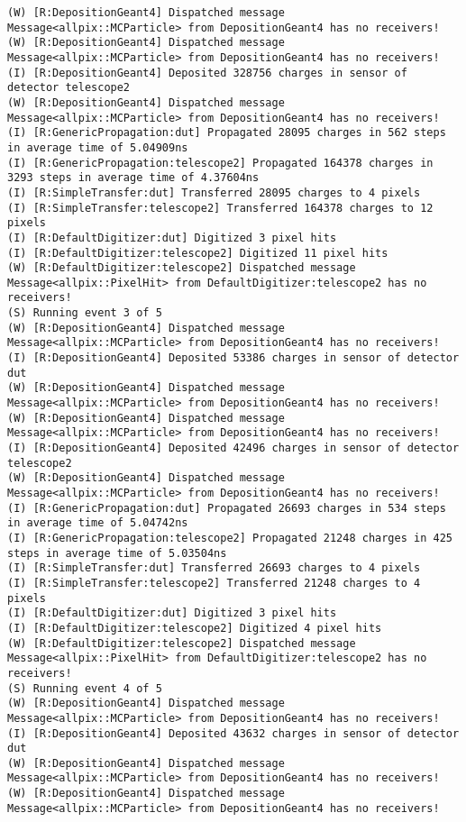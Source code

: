 \begin{lstlisting}[breaklines]
(W) [R:DepositionGeant4] Dispatched message Message<allpix::MCParticle> from DepositionGeant4 has no receivers!
(W) [R:DepositionGeant4] Dispatched message Message<allpix::MCParticle> from DepositionGeant4 has no receivers!
(I) [R:DepositionGeant4] Deposited 328756 charges in sensor of detector telescope2
(W) [R:DepositionGeant4] Dispatched message Message<allpix::MCParticle> from DepositionGeant4 has no receivers!
(I) [R:GenericPropagation:dut] Propagated 28095 charges in 562 steps in average time of 5.04909ns
(I) [R:GenericPropagation:telescope2] Propagated 164378 charges in 3293 steps in average time of 4.37604ns
(I) [R:SimpleTransfer:dut] Transferred 28095 charges to 4 pixels
(I) [R:SimpleTransfer:telescope2] Transferred 164378 charges to 12 pixels
(I) [R:DefaultDigitizer:dut] Digitized 3 pixel hits
(I) [R:DefaultDigitizer:telescope2] Digitized 11 pixel hits
(W) [R:DefaultDigitizer:telescope2] Dispatched message Message<allpix::PixelHit> from DefaultDigitizer:telescope2 has no receivers!
(S) Running event 3 of 5
(W) [R:DepositionGeant4] Dispatched message Message<allpix::MCParticle> from DepositionGeant4 has no receivers!
(I) [R:DepositionGeant4] Deposited 53386 charges in sensor of detector dut
(W) [R:DepositionGeant4] Dispatched message Message<allpix::MCParticle> from DepositionGeant4 has no receivers!
(W) [R:DepositionGeant4] Dispatched message Message<allpix::MCParticle> from DepositionGeant4 has no receivers!
(I) [R:DepositionGeant4] Deposited 42496 charges in sensor of detector telescope2
(W) [R:DepositionGeant4] Dispatched message Message<allpix::MCParticle> from DepositionGeant4 has no receivers!
(I) [R:GenericPropagation:dut] Propagated 26693 charges in 534 steps in average time of 5.04742ns
(I) [R:GenericPropagation:telescope2] Propagated 21248 charges in 425 steps in average time of 5.03504ns
(I) [R:SimpleTransfer:dut] Transferred 26693 charges to 4 pixels
(I) [R:SimpleTransfer:telescope2] Transferred 21248 charges to 4 pixels
(I) [R:DefaultDigitizer:dut] Digitized 3 pixel hits
(I) [R:DefaultDigitizer:telescope2] Digitized 4 pixel hits
(W) [R:DefaultDigitizer:telescope2] Dispatched message Message<allpix::PixelHit> from DefaultDigitizer:telescope2 has no receivers!
(S) Running event 4 of 5
(W) [R:DepositionGeant4] Dispatched message Message<allpix::MCParticle> from DepositionGeant4 has no receivers!
(I) [R:DepositionGeant4] Deposited 43632 charges in sensor of detector dut
(W) [R:DepositionGeant4] Dispatched message Message<allpix::MCParticle> from DepositionGeant4 has no receivers!
(W) [R:DepositionGeant4] Dispatched message Message<allpix::MCParticle> from DepositionGeant4 has no receivers!

\end{lstlisting}
